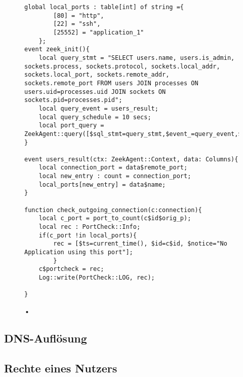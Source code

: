 \begin{figure}
\begin{lstlisting}
global local_ports : table[int] of string ={
        [80] = "http",
        [22] = "ssh",
        [25552] = "application_1"
    };
event zeek_init(){
    local query_stmt = "SELECT users.name, users.is_admin, sockets.process, sockets.protocol, sockets.local_addr, sockets.local_port, sockets.remote_addr, sockets.remote_port FROM users JOIN processes ON users.uid=processes.uid JOIN sockets ON sockets.pid=processes.pid";
    local query_event = users_result;
    local query_schedule = 10 secs;
    local port_query = ZeekAgent::query([$sql_stmt=query_stmt,$event_=query_event,$schedule_=query_schedule]);
}

event users_result(ctx: ZeekAgent::Context, data: Columns){
    local connection_port = data$remote_port;
   	local new_entry : count = connection_port;
    local_ports[new_entry] = data$name;
}

function check_outgoing_connection(c:connection){
    local c_port = port_to_count(c$id$orig_p);
    local rec : PortCheck::Info;
    if(c_port !in local_ports){
        rec = [$ts=current_time(), $id=c$id, $notice="No Application using this port"];
        }
    c$portcheck = rec;
    Log::write(PortCheck::LOG, rec);
    
}
\end{lstlisting}
\caption{•}
\end{figure}
\subsection{DNS-Auflösung}
\subsection{Rechte eines Nutzers}
\subsection{}